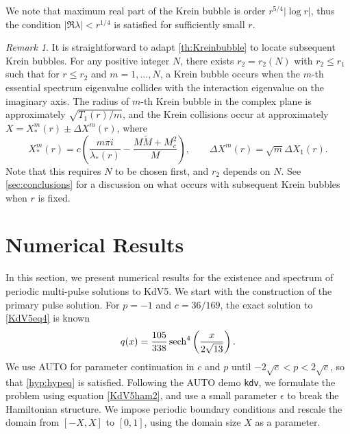 \documentclass[12pt]{elsarticle}
\theoremstyle{plain}
\theoremstyle{definition}
\theoremstyle{remark}
\newtheorem{remark}[theorem]{Remark}
\numberwithin{theorem}{section}
\numberwithin{equation}{section}
\begin{document}
\noi We note that maximum real part of the Krein bubble is order $r^{5/4}|\log r|$, thus the condition $|\Re \lambda| < r^{1/4}$ is satisfied for sufficiently small $r$.

\begin{remark}\label{remark:kreinbubbles}
It is straightforward to adapt \cref{th:Kreinbubble} to locate subsequent Krein bubbles. For any positive integer $N$, there exists $r_2 = r_2(N)$ with $r_2 \leq r_1$ such that for $r \leq r_2$ and $m = 1, \dots, N$, a Krein bubble occurs when the $m$-th essential spectrum eigenvalue collides with the interaction eigenvalue on the imaginary axis. The radius of $m$-th Krein bubble in the complex plane is approximately $\sqrt{T_1(r) / m}$, and the Krein collisions occur at approximately $X = X^m_*(r) \pm \Delta X^m(r)$, where 
\[
X^m_*(r) = c \left( \frac{m \pi i}{\lambda_*(r)} - \frac{M \tilde{M} + M_c^2 }{M}\right), \qquad \Delta X^m(r) = \sqrt{m} \Delta X_1(r).
\]
Note that this requires $N$ to be chosen first, and $r_2$ depends on $N$. See \cref{sec:conclusions} for a discussion on what occurs with subsequent Krein bubbles when $r$ is fixed.
\end{remark}

\section{Numerical Results}\label{sec:numerics}

In this section, we present numerical results for the existence and spectrum of periodic multi-pulse solutions to KdV5. We start with the construction of the primary pulse solution. For $p = -1$ and $c = 36/169$, the exact solution to \cref{KdV5eq4} is known \cite[(3)]{Pelinovsky2007}
\begin{equation}\label{KdV5exactsol}
q(x) = \frac{105}{338}\mathop\mathrm{sech}\nolimits^4\left(\frac{x}{2\sqrt{13}} \right).
\end{equation}
We use AUTO for parameter continuation in $c$ and $p$ until $-2 \sqrt{c} < p < 2 \sqrt{c}$, so that \cref{hyp:hypeq} is satisfied. Following the AUTO demo \texttt{kdv}, we formulate the problem using equation \cref{KdV5ham2}, and use a small parameter $\epsilon$ to break the Hamiltonian structure. We impose periodic boundary conditions and rescale the domain from $[-X, X]$ to $[0, 1]$, using the domain size $X$ as a parameter. 
\end{document}
